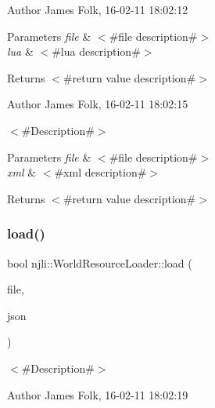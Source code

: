\begin{DoxyAuthor}{Author}
James Folk, 16-\/02-\/11 18\+:02\+:12
\end{DoxyAuthor}

\begin{DoxyParams}{Parameters}
{\em file} & $<$\#file description\#$>$ \\
\hline
{\em lua} & $<$\#lua description\#$>$\\
\hline
\end{DoxyParams}
\begin{DoxyReturn}{Returns}
$<$\#return value description\#$>$ 
\end{DoxyReturn}
\begin{DoxyAuthor}{Author}
James Folk, 16-\/02-\/11 18\+:02\+:15
\end{DoxyAuthor}
$<$\#\+Description\#$>$


\begin{DoxyParams}{Parameters}
{\em file} & $<$\#file description\#$>$ \\
\hline
{\em xml} & $<$\#xml description\#$>$\\
\hline
\end{DoxyParams}
\begin{DoxyReturn}{Returns}
$<$\#return value description\#$>$ 
\end{DoxyReturn}
\mbox{\label{classnjli_1_1_world_resource_loader_af27a57867941d659a2b497656b3e6b42}} 
\subsubsection{\texorpdfstring{load()}{load()}\hspace{0.1cm}{\footnotesize\ttfamily [9/13]}}
{\footnotesize\ttfamily bool njli\+::\+World\+Resource\+Loader\+::load (\begin{DoxyParamCaption}\item[{const char $\ast$}]{file,  }\item[{\mbox{\hyperlink{classnjli_1_1_json_j_l_i}{Json\+J\+LI}} $\ast$}]{json }\end{DoxyParamCaption})}



$<$\#\+Description\#$>$ 

\begin{DoxyAuthor}{Author}
James Folk, 16-\/02-\/11 18\+:02\+:19
\end{DoxyAuthor}


